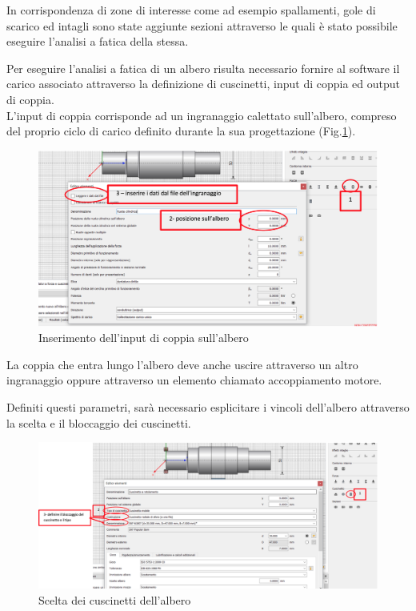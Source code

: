 In corrispondenza di zone di interesse come ad esempio spallamenti, gole di scarico ed intagli sono state aggiunte sezioni attraverso le quali è stato possibile eseguire l'analisi a fatica della stessa. 

Per eseguire l'analisi a fatica di un albero risulta necessario fornire al software il carico associato attraverso la definizione di cuscinetti, input di coppia ed output di coppia.\\
L'input di coppia corrisponde ad un ingranaggio calettato sull'albero, compreso del proprio ciclo di carico definito durante la sua progettazione (Fig.\ref{fig:MetodologiaAlberi2}).
\begin{figure}[h]
    \centering
    \includegraphics[scale=0.5]{Immagini/MetodologiaAlberi2.png}
    \caption{Inserimento dell'input di coppia sull'albero}
    \label{fig:MetodologiaAlberi2}
\end{figure}

La coppia che entra lungo l'albero deve anche uscire attraverso un altro ingranaggio oppure attraverso un elemento chiamato accoppiamento motore.

Definiti questi parametri, sarà necessario esplicitare i vincoli dell'albero attraverso la scelta e il bloccaggio dei cuscinetti.
\begin{figure}[h]
    \centering
    \includegraphics[scale=0.27]{Immagini/MetodologiaAlberi3.png}
    \caption{Scelta dei cuscinetti dell'albero}
    \label{fig:MetodologiaAlberi3}
\end{figure}

